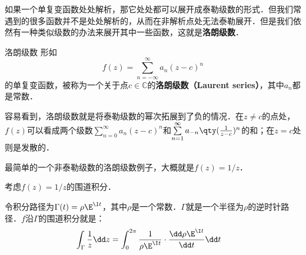 

如果一个单复变函数处处解析，那它处处都可以展开成泰勒级数的形式．但我们常遇到的很多函数并不是处处解析的，从而在非解析点处无法泰勒展开．但是我们依然有一种类似级数的办法来展开其中一些函数，这就是\textbf{洛朗级数}．

\begin{definition}{洛朗级数}
形如
\begin{equation}
f(z)=\sum\limits_{n=-\infty}^{\infty} a_n(z-c)^n
\end{equation}
的单复变函数，被称为一个关于点$c\in\mathbb{C}$的\textbf{洛朗级数（Laurent series）}，其中$a_n$都是常数．


\end{definition}

容易看到，洛朗级数就是将泰勒级数的幂次拓展到了负的情况．在$z\neq c$的点处，$f(z)$可以看成两个级数$\sum\limits_{n=0}^{\infty} a_n(z-c)^n$和$\sum\limits_{n=1}^{\infty} a_{-n}\qty(\frac{1}{z-c})^n$的和；在$z=c$处则是发散的．

最简单的一个非泰勒级数的洛朗级数例子，大概就是$f(z)=1/z$．

\begin{example}{}
考虑$f(z)=1/z$的围道积分．

令积分路径为$\Gamma(t)=\rho\E^{\I t}$，其中$\rho$是一个常数．$\Gamma$就是一个半径为$\rho$的逆时针路径．$f$沿$\Gamma$的围道积分就是：
\begin{equation}
\begin{aligned}
\int_{\Gamma}\frac{1}{z}\dd z&=\int^{2\pi}_0\frac{1}{\rho\E^{\I t}}\cdot\frac{\dd\rho\E^{\I t}}{\dd t}\dd t
\end{aligned}
\end{equation}
\end{example}

















